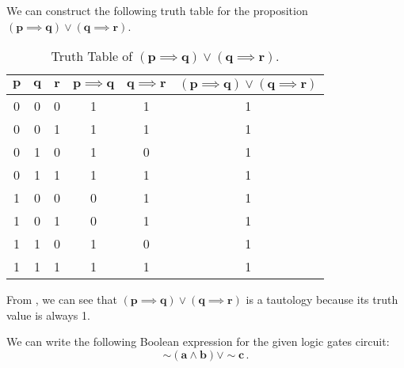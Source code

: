\begin{subquestions}
\subquestion

\begin{subsubquestions}
	
\subsubquestion

We can construct the following truth table for the proposition $\boldsymbol{(p \implies q) \lor (q \implies r)}$.
\begin{table}[ht]
	\centering
	\begin{tabular}{|c|c|c|c|c|c|}
		\hline
		$\boldsymbol{p}$ & $\boldsymbol{q}$ & $\boldsymbol{r}$ & $\boldsymbol{p \implies q}$ & $\boldsymbol{q \implies r}$ & $\boldsymbol{(p \implies q) \lor (q \implies r)}$ \\
		\hline
		0 & 0 & 0 & 1 & 1 & 1 \\
		0 & 0 & 1 & 1 & 1 & 1 \\
		0 & 1 & 0 & 1 & 0 & 1 \\
		0 & 1 & 1 & 1 & 1 & 1 \\
		1 & 0 & 0 & 0 & 1 & 1 \\
		1 & 0 & 1 & 0 & 1 & 1 \\
		1 & 1 & 0 & 1 & 0 & 1 \\
		1 & 1 & 1 & 1 & 1 & 1 \\
		\hline
	\end{tabular}
	\caption{\label{2014:q1:tab:Tab2} Truth Table of $\boldsymbol{(p \implies q) \lor (q \implies r)}$.}
\end{table}


\subsubquestion

From , we can see that $\boldsymbol{(p \implies q) \lor (q \implies r)}$ is a tautology because its truth value is always 1.
\end{subsubquestions}


\subquestion

We can write the following Boolean expression for the given logic gates circuit:
\begin{equation}
	\boldsymbol{\sim (a \land b) \lor \sim c}\,.
\end{equation}



\end{subquestions}
